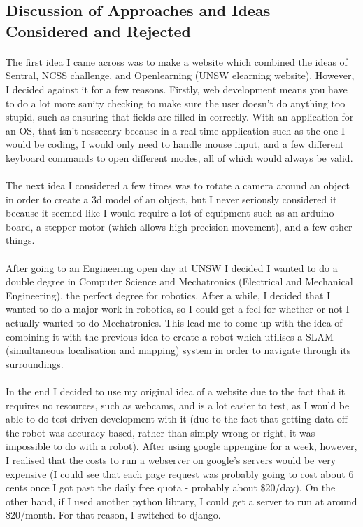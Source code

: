 \subsection{Discussion of Approaches and Ideas Considered and Rejected}
\paragraph{}
The first idea I came across was to make a website which combined the ideas of Sentral, NCSS challenge, and Openlearning (UNSW elearning website). However, I decided against it for a few reasons. Firstly, web development means you have to do a lot more sanity checking to make sure the user doesn't do anything too stupid, such as ensuring that fields are filled in correctly. With an application for an OS, that isn't nessecary because in a real time application such as the one I would be coding, I would only need to handle mouse input, and a few different keyboard commands to open different modes, all of which would always be valid.

\paragraph{}
The next idea I considered a few times was to rotate a camera around an object in order to create a 3d model of an object, but I never seriously considered it because it seemed like I would require a lot of equipment such as an arduino board, a stepper motor (which allows high precision movement), and a few other things.

\paragraph{}
After going to an Engineering open day at UNSW I decided I wanted to do a double degree in Computer Science and Mechatronics (Electrical and Mechanical Engineering), the perfect degree for robotics. After a while, I decided that I wanted to do a major work in robotics, so I could get a feel for whether or not I actually wanted to do Mechatronics. This lead me to come up with the idea of combining it with the previous idea to create a robot which utilises a SLAM (simultaneous localisation and mapping) system in order to navigate through its surroundings.

\paragraph{}
In the end I decided to use my original idea of a website due to the fact that it requires no resources, such as webcams, and is a lot easier to test, as I would be able to do test driven development with it (due to the fact that getting data off the robot was accuracy based, rather than simply wrong or right, it was impossible to do with a robot). After using google appengine for a week, however, I realised that the costs to run a webserver on google's servers would be very expensive (I could see that each page request was probably going to cost about 6 cents once I got past the daily free quota - probably about \$20/day). On the other hand, if I used another python library, I could get a server to run at around \$20/month. For that reason, I switched to django.
